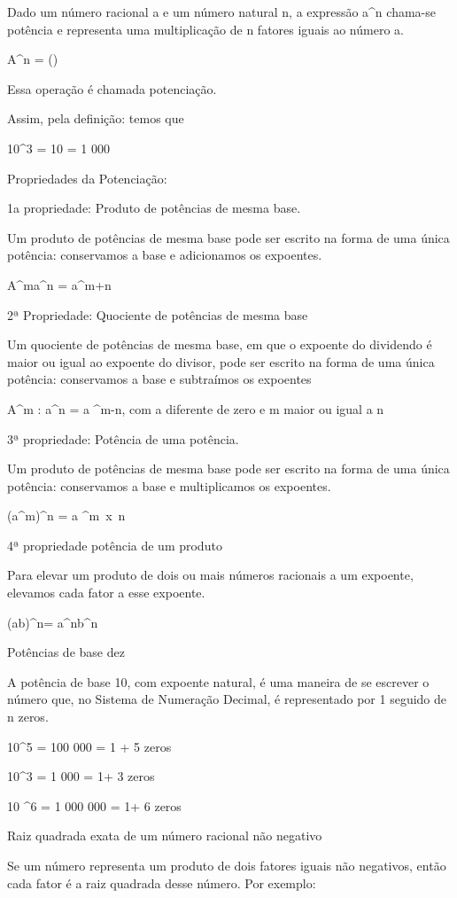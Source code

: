 Dado um número racional a e um número natural n, a expressão
a^n chama-se potência e representa uma multiplicação de
n fatores iguais ao número a.

A^n = ()

Essa operação é chamada potenciação.

Assim, pela definição: temos que

10^3 = 10 = 1 000

Propriedades da Potenciação:

1a propriedade: Produto de potências de mesma base.

Um produto de potências de mesma base pode ser escrito na forma de uma
única potência: conservamos a base e adicionamos os expoentes.

A^m\times a^n = a^m+n

2ª Propriedade: Quociente de potências de mesma base

Um quociente de potências de mesma base, em que o expoente do dividendo
é maior ou igual ao expoente do divisor, pode ser escrito na forma de
uma única potência: conservamos a base e subtraímos os expoentes

A^m : a^n = a ^m-n,
com a diferente de zero e m maior ou igual a n

3ª propriedade: Potência de uma potência.

Um produto de potências de mesma base pode ser escrito na forma de uma
única potência: conservamos a base e multiplicamos os expoentes.

(a^m)^n = a ^m~x~n

4ª propriedade potência de um produto

Para elevar um produto de dois ou mais números racionais a um expoente,
elevamos cada fator a esse expoente.

(a\times b)^n= a^n\times b^n

Potências de base dez

A potência de base 10, com expoente natural, é uma maneira de se
escrever o número que, no Sistema de Numeração Decimal, é representado
por 1 seguido de n zeros.

10^5 = 100 000 = 1 + 5 zeros

10^3 = 1 000 = 1+ 3 zeros

10 ^6 = 1 000 000 = 1+ 6 zeros

Raiz quadrada exata de um número racional não negativo

Se um número representa um produto de dois fatores iguais não negativos,
então cada fator é a raiz quadrada desse número. Por exemplo:

